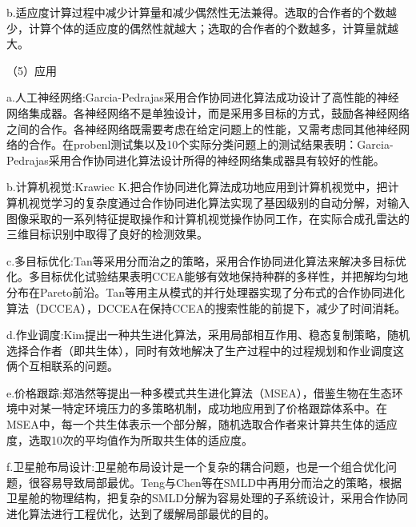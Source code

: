 \documentclass[8pt]{article}
\begin{document}
\begin{description}
      \item b.适应度计算过程中减少计算量和减少偶然性无法兼得。选取的合作者的个数越少，计算个体的适应度的偶然性就越大；选取的合作者的个数越多，计算量就越大。
      \item（5）应用\\
      \item a.人工神经网络:Garcia-Pedrajas采用合作协同进化算法成功设计了高性能的神经网络集成器。各神经网络不是单独设计，而是采用多目标的方式，鼓励各神经网络之间的合作。各神经网络既需要考虑在给定问题上的性能，又需考虑同其他神经网络的合作。在probenl测试集以及10个实际分类问题上的测试结果表明：Garcia-Pedrajas采用合作协同进化算法设计所得的神经网络集成器具有较好的性能。
      \item b.计算机视觉:Krawiec K.把合作协同进化算法成功地应用到计算机视觉中，把计算机视觉学习的复杂度通过合作协同进化算法实现了基因级别的自动分解，对输入图像采取的一系列特征提取操作和计算机视觉操作协同工作，在实际合成孔雷达的三维目标识别中取得了良好的检测效果。
      \item c.多目标优化:Tan等采用分而治之的策略，采用合作协同进化算法来解决多目标优化。多目标优化试验结果表明CCEA能够有效地保持种群的多样性，并把解均匀地分布在Pareto前沿。Tan等用主从模式的并行处理器实现了分布式的合作协同进化算法（DCCEA），DCCEA在保持CCEA的搜索性能的前提下，减少了时间消耗。      
      \item d.作业调度:Kim提出一种共生进化算法，采用局部相互作用、稳态复制策略，随机选择合作者（即共生体），同时有效地解决了生产过程中的过程规划和作业调度这俩个互相联系的问题。      
      \item e.价格跟踪:郑浩然等提出一种多模式共生进化算法（MSEA），借鉴生物在生态环境中对某一特定环境压力的多策略机制，成功地应用到了价格跟踪体系中。在MSEA中，每一个共生体表示一个部分解，随机选取合作者来计算共生体的适应度，选取10次的平均值作为所取共生体的适应度。      
      \item f.卫星舱布局设计:卫星舱布局设计是一个复杂的耦合问题，也是一个组合优化问题，很容易导致局部最优。Teng与Chen等在SMLD中再用分而治之的策略，根据卫星舱的物理结构，把复杂的SMLD分解为容易处理的子系统设计，采用合作协同进化算法进行工程优化，达到了缓解局部最优的目的。      
      \end{description}  
\end{document}
